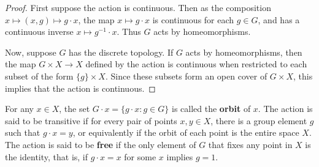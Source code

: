 \begin{proof}
First suppose the action is continuous. Then as the composition $x\mapsto (x,g)\mapsto g\cdot  x$, the map $x\mapsto g\cdot x$ is continuous for each $g\in G$, and has a continuous inverse $x\mapsto g^{-1}\cdot x$. Thus $G$ acts by homeomorphisms.\par
Now, suppose $G$ has the discrete topology. If $G$ acts by homeomorphisms, then the map $G\times X\to X$ defined by the action is continuous when restricted to each subset of the form $\{g\}\times X$. Since these subsets form an open cover of $G\times X$, this implies that the action is continuous.
\end{proof}
For any $x\in X$, the set $G\cdot x=\{g\cdot x:g\in G\}$ is called the \textbf{orbit} of $x$. The action is said to be transitive if for every pair of points $x,y\in X$, there is a group element $g$ such that $g\cdot x=y$, or equivalently if the orbit of each point is the entire space $X$. The action is said to be \textbf{free} if the only element of $G$ that fixes any point in $X$ is the identity, that is, if $g\cdot x=x$ for some $x$ implies $g=1$.
